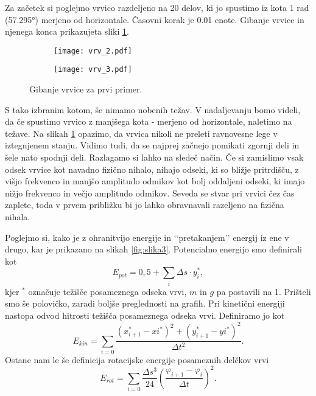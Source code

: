 \documentclass[12pt,a4paper]{article}
\begin{document}
Za začetek si poglejmo vrvico razdeljeno na 20 delov, ki jo spustimo iz kota 1 rad (57.295°) merjeno od horizontale. Časovni korak je 0.01 enote. Gibanje vrvice in njenega konca prikazujeta sliki \ref{fig:slika2}. 

\begin{figure}[H]
    \centering
    \begin{subfigure}[b]{0.45\textwidth}  			
        \texttt{[image: vrv\_2.pdf]}
    \end{subfigure}
    \begin{subfigure}[b]{0.45\textwidth}  			
        \texttt{[image: vrv\_3.pdf]}
    \end{subfigure}
    \caption{Gibanje vrvice za prvi primer.} \label{fig:slika2}
\end{figure}

\noindent S tako izbranim kotom, še nimamo nobenih težav. V nadaljevanju bomo videli, da če spustimo vrvico z manjšega kota - merjeno od horizontale, naletimo na težave. Na slikah \ref{fig:slika2} opazimo, da vrvica nikoli ne preleti ravnovesne lege v iztegnjenem stanju. Vidimo tudi, da se najprej začnejo pomikati zgornji deli in šele nato spodnji deli. Razlagamo si lahko na sledeč način. Če si zamislimo vsak odsek vrvice kot navadno fizično nihalo, nihajo odseki, ki so bližje pritrdišču, z višjo frekvenco in manjšo amplitudo odmikov kot bolj oddaljeni odseki, ki imajo nižjo frekvenco in večjo amplitudo odmikov. Seveda se stvar pri vrvici čez čas zaplete, toda v prvem približku bi jo lahko obravnavali razeljeno na fizična nihala.

Poglejmo si, kako je z ohranitvijo energije in ‘‘pretakanjem’’ energij iz ene v drugo, kar je prikazano na slikah \ref{fig:slika3}. Potencialno energijo smo definirali kot
\begin{equation*}
E_{pot}= 0,5 + \sum_i \Delta s \cdot y_i ^{*},
\end{equation*}
 kjer $^{*}$ označuje težišče posameznega odseka vrvi, $m$ in $g$ pa postavili na 1. Prišteli smo še polovičko, zaradi boljše preglednosti na grafih. Pri kinetični energiji nastopa odvod hitrosti težišča posameznega odseka vrvi. Definiramo jo kot
 \begin{equation*}
 E_{kin}= \sum _{i=0} \frac{\left( x_{i+1} ^{*} - x{i}^{*}  \right)^{2} +\left( y_{i+1}^{*} - y{i} ^{*}  \right)^{2} }{\Delta t ^{2}}.
 \end{equation*}
Ostane nam le še definicija rotacijske energije posameznih delčkov vrvi
\begin{equation*}
E_{rot}= \sum_{i=0} \frac{\Delta s ^{3}}{24} \left(\frac{\varphi _{i+1} - \varphi_i}{ \Delta t} \right)^{2}.
\end{equation*}
 
\end{document}
